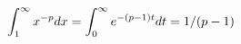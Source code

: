 \documentclass[preview]{standalone}
\begin{document}
\begin{align*}
\special{dvisvgm:raw <g id='unique000'>}\int_1^\infty x^{-p}dx=\int_0^\infty e^{-(p-1)t}dt=1/(p-1)\special{dvisvgm:raw </g>}
\end{align*}
\end{document}
